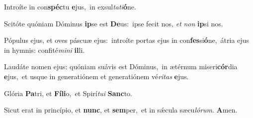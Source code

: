 Introíte in con\textbf{spéc}tu \textbf{e}jus,~\redgreheightstar in exsul\textit{ta}\textit{ti}\textbf{ó}ne.

Scitóte quóniam Dóminus \textbf{ip}se est \textbf{De}us:~\redgreheightstar ipse fecit nos, \textit{et} \textit{non} \textbf{ip}si nos.

Pópulus ejus, et oves páscuæ ejus:~\reddagger introíte portas ejus in con\textbf{fes}si\textbf{ó}ne,~\redgreheightstar átria ejus in hymnis: confité\textit{mi}\textit{ni} \textbf{il}li.

Laudáte nomen ejus: quóniam suávis est Dóminus,~\reddagger in ætérnum miseri\textbf{cór}dia \textbf{e}jus,~\redgreheightstar et usque in generatiónem et generatiónem vé\textit{ri}\textit{tas} \textbf{e}jus.

Glória \textbf{Pa}tri, et \textbf{Fí}\textbf{li}o,~\redgreheightstar et Spirí\textit{tu}\textit{i} \textbf{Sanc}to.

Sicut erat in princípio, et \textbf{nunc}, et \textbf{sem}per,~\redgreheightstar et in sǽcula sæcu\textit{ló}\textit{rum}. \textbf{A}men.

